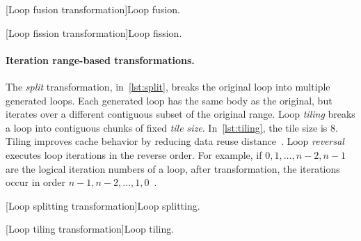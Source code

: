 \begin{center}
\begin{minipage}{\textwidth}
\captionsetup{type=lstlisting}
\begin{minipage}{.45\textwidth}
\captionsetup{type=lstlisting}
[Loop fusion transformation]{Loop fusion.}
\label{lst:fusion}
\end{minipage}\hfill%
\begin{minipage}{.45\textwidth}
[Loop fission transformation]{Loop fission.}
\label{lst:fission}
\end{minipage}
\end{minipage}
\end{center}

\paragraph*{Iteration range-based transformations.}
The \emph{split} transformation,
in~\autoref{lst:split}, breaks the original loop into multiple generated loops.
Each generated loop has the same body as the original, but iterates over a different contiguous subset of the original range.
Loop \emph{tiling} breaks a loop into contiguous chunks of fixed \emph{tile size}.
In~\autoref{lst:tiling}, the tile size is 8.
Tiling improves cache behavior by reducing data reuse distance~\cite{bertolacci2018}.
Loop \emph{reversal} executes loop iterations in the reverse order.
For example, if \(0, 1,\ldots, n-2, n-1\) are the logical iteration numbers of a loop, after transformation, the iterations occur in order \(n-1, n-2,\ldots, 1, 0\)~\cite{openmp_api}.

\begin{center}
\begin{minipage}{\textwidth}
\captionsetup{type=lstlisting}
\begin{minipage}{.45\textwidth}
[Loop splitting transformation]{Loop splitting.}
\label{lst:split}
\end{minipage}\hfill%
\begin{minipage}{.45\textwidth}
[Loop tiling transformation]{Loop tiling.}
\label{lst:tiling}
\end{minipage}
\end{minipage}
\end{center}

